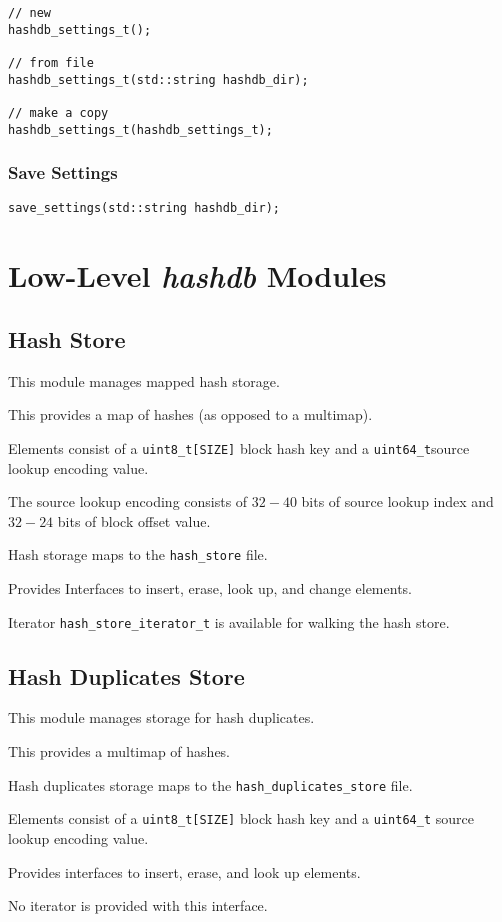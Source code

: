 \documentclass[12pt,twoside]{article}
\newcommand{\hdb}{\emph{hashdb}\xspace}
\begin{document}
\begin{small}
\begin{verbatim}
// new
hashdb_settings_t();

// from file
hashdb_settings_t(std::string hashdb_dir);

// make a copy
hashdb_settings_t(hashdb_settings_t);
\end{verbatim}
\end{small}

\subsubsection{Save Settings}
\begin{small}
\begin{verbatim}
save_settings(std::string hashdb_dir);
\end{verbatim}
\end{small}


\section{Low-Level \hdb Modules}

\subsection{Hash Store}
This module manages mapped hash storage.
\begin{compactitem}
\item This provides a map of hashes (as opposed to a multimap).
\item Elements consist of a
\texttt{uint8\_t[SIZE]} block hash key and a
\texttt{uint64\_t}source lookup encoding value.
\item The source lookup encoding consists of $32-40$ bits
of source lookup index and $32-24$ bits of block offset value.
\item Hash storage maps to the \texttt{hash\_store} file.
\item Provides Interfaces to insert, erase, look up, and change elements.
\item Iterator \texttt{hash\_store\_iterator\_t} is available
for walking the hash store.
\end{compactitem}

\subsection{Hash Duplicates Store}
This module manages storage for hash duplicates.
\begin{compactitem}
\item This provides a multimap of hashes.
\item Hash duplicates storage maps to the \texttt{hash\_duplicates\_store} file.
\item Elements consist of a
\texttt{uint8\_t[SIZE]} block hash key and a
\texttt{uint64\_t} source lookup encoding value.
\item Provides interfaces to insert, erase, and look up elements.
\item No iterator is provided with this interface.
\end{compactitem}
\end{document}
